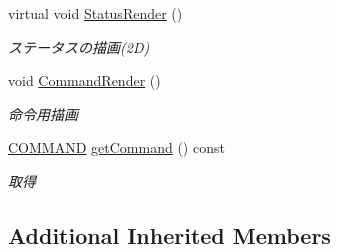 \begin{DoxyCompactItemize}
virtual void \hyperlink{class_player_ab32629a7abedd7b3984545c37fda8008}{Status\-Render} ()
\begin{DoxyCompactList}\small\item\em ステータスの描画(2\-D) \end{DoxyCompactList}\item 
void \hyperlink{class_player_ae85aa995df4b7cc7bbc6411fe1ae50f9}{Command\-Render} ()
\begin{DoxyCompactList}\small\item\em 命令用描画 \end{DoxyCompactList}\item 
\hyperlink{class_player_a70057174eaea9fd441ca86cc7bb896ed}{C\-O\-M\-M\-A\-N\-D} \hyperlink{class_player_af11a10fc9ebfa11af6a6e76e1f627298}{get\-Command} () const 
\begin{DoxyCompactList}\small\item\em 取得 \end{DoxyCompactList}\end{DoxyCompactItemize}
\subsection*{Additional Inherited Members}


